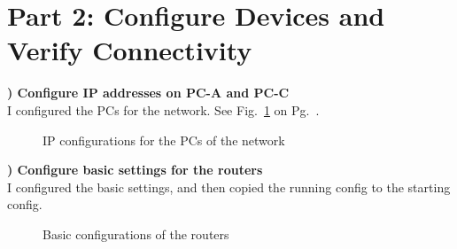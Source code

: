 \documentclass{report}
\newcommand{\mysection}[1]{\section*{#1}}
\newcommand{\mysubsection}[2]{\textbf{\romannumeral #1) #2}}
\begin{document}
\clearpage

\mysection{\textbf{Part 2: Configure Devices and Verify Connectivity }}

\mysubsection{1}{Configure IP addresses on PC-A and PC-C}\\
I configured the PCs for the network. See Fig.~\ref{P2Conf18PC} on
Pg.~\pageref{P2Conf18PC}.


\begin{figure}[!hbt]\centering
{}\hfill
{}\par 
\caption{IP configurations for the PCs of the network}\label{P2Conf18PC}
\end{figure}




\noindent\mysubsection{2}{Configure basic settings for the routers}\\
I configured the basic settings, and then copied the running config to the
starting config.


\begin{figure}[!hbt]\centering
{}\hfill
{}\par 
{}
\caption{Basic configurations of the routers}\label{P2Config18R}
\end{figure}
\end{document}
